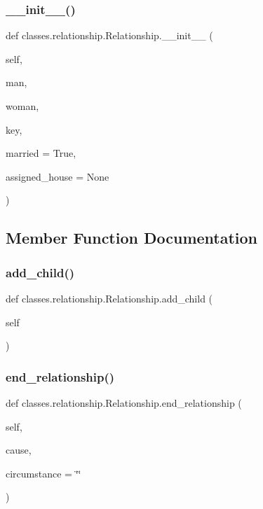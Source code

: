 \subsubsection{\texorpdfstring{\+\_\+\+\_\+init\+\_\+\+\_\+()}{\_\_init\_\_()}}
{\footnotesize\ttfamily def classes.\+relationship.\+Relationship.\+\_\+\+\_\+init\+\_\+\+\_\+ (\begin{DoxyParamCaption}\item[{}]{self,  }\item[{}]{man,  }\item[{}]{woman,  }\item[{}]{key,  }\item[{}]{married = {\ttfamily True},  }\item[{}]{assigned\+\_\+house = {\ttfamily None} }\end{DoxyParamCaption})}



\subsection{Member Function Documentation}
\mbox{\label{classclasses_1_1relationship_1_1Relationship_a035ec849e088f60ccdeebbb9310a0bc4}} 
\subsubsection{\texorpdfstring{add\+\_\+child()}{add\_child()}}
{\footnotesize\ttfamily def classes.\+relationship.\+Relationship.\+add\+\_\+child (\begin{DoxyParamCaption}\item[{}]{self }\end{DoxyParamCaption})}

\mbox{\label{classclasses_1_1relationship_1_1Relationship_a5965a52b567193788d75695c44a7150a}} 
\subsubsection{\texorpdfstring{end\+\_\+relationship()}{end\_relationship()}}
{\footnotesize\ttfamily def classes.\+relationship.\+Relationship.\+end\+\_\+relationship (\begin{DoxyParamCaption}\item[{}]{self,  }\item[{}]{cause,  }\item[{}]{circumstance = {\ttfamily \char`\"{}\char`\"{}} }\end{DoxyParamCaption})}

